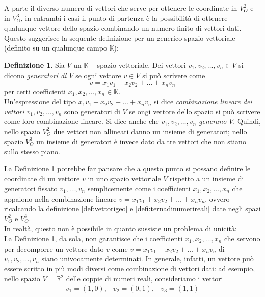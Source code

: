 \documentclass{book}
\theoremstyle{definition}
\newtheorem{defi}{Definizione}[section]
\theoremstyle{plain}
\begin{document}
A parte il diverso numero di vettori che serve per ottenere le coordinate in $V_O^2$ e in $V_O^3$, in entrambi i casi il punto di partenza è la possibilità di ottenere qualunque vettore dello spazio combinando un numero finito di vettori dati.\\
Questo suggerisce la sequente definizione per un generico spazio vettoriale (definito su un qualunque campo $\mathds{K}$):
\begin{defi}
  \label{defi:spaziovect2}
  Sia $V$ un $\mathds{K}-$spazio vettoriale. Dei vettori $v_1,v_2,\dots,v_n\in V$ si dicono \textit{generatori di $V$} se ogni vettore $v\in V$ si può scrivere come
  \begin{equation*}
    v=x_1v_1+x_2v_2+\dots+x_nv_n
  \end{equation*}
  per certi coefficienti $x_1,x_2,\dots,x_n\in\mathds{K}$.\\
  Un'espressione del tipo $x_1v_1+x_2v_2+\dots+x_nv_n$ si dice \textit{combinazione lineare dei vettori $v_1,v_2,\dots,v_n$} sono generatori di $V$ se ongi vettore dello spazio si può scrivere come loro combinazione lineare. Si dice anche che $v_1,v_2,\dots,v_n$ \textit{generano} $V$. Quindi, nello spazio $V_O^2$ due vettori non allineati danno un insieme di generatori; nello spazio $V_O^3$ un insieme di generatori è invece dato da tre vettori che non stiano sullo stesso piano.
\end{defi}
La Definizione \ref{defi:spaziovect2} potrebbe far pansare che a questo punto si possano definire le coordinate di un vettore $v$ in uno spazio vettoriale $V$ rispetto a un insieme di generatori fissato $v_1,\dots, v_n$ semplicemente come i coefficienti $x_1,x_2,\dots,x_n$ che appaiono nella combinazione lineare $v=x_1v_1+x_2v_2+\dots+x_nv_n$, ovvero ricalcando la definizione \ref{def:vettorigeo} e \ref{defi:ternadinumerireali} date negli spazi $V_O^2$ e $V_O^3$.\\
In realtà, questo non è possibile in quanto sussiste un problema di unicità:\\
La Definizione \ref{defi:spaziovect2}, da sola, non garantisce che i coefficienti $x_1,x_2,\dots, x_n$ che servono per decomporre un vettore dato $v$ come $v=x_1v_1+x_2v_2+\dots +x_nv_n$ di $v_1,v_2,\dots, v_n$ siano univocamente determinati. In generale, infatti, un vettore può essere scritto in più modi diversi come combinazione di vettori dati: ad esempio, nello spazio $V=\mathds{R}^2$ delle coppie di numeri reali, consideriamo i vettori
\begin{eqnarray*}
  v_1=(1,0), & v_2=(0,1), & v_3=(1,1)
\end{eqnarray*}
\end{document}
